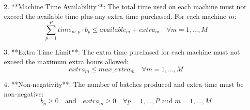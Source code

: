 \documentclass{article}
\begin{document}
2. **Machine Time Availability**: The total time used on each machine must not exceed the available time plus any extra time purchased. For each machine $m$:
\[
\sum_{p=1}^P time_{m,p} \cdot b_p \leq available_m + extra_m \quad \forall m = 1, \ldots, M
\]

3. **Extra Time Limit**: The extra time purchased for each machine must not exceed the maximum extra hours allowed:
\[
extra_m \leq max\_extra_m \quad \forall m = 1, \ldots, M
\]

4. **Non-negativity**: The number of batches produced and extra time must be non-negative:
\[
b_p \geq 0 \quad \text{and} \quad extra_m \geq 0 \quad \forall p = 1, \ldots, P \text{ and } m = 1, \ldots, M
\]
\end{document}
